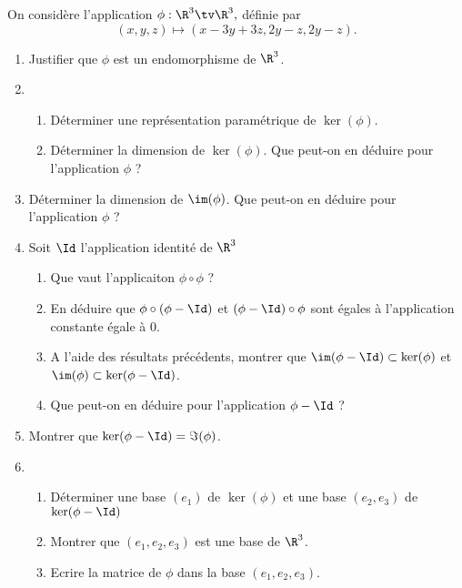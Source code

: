 



\begin{exercice}%
On considère l'application $\phi : \R^3 \tv \R^3, $ définie par 
$$(x,y,z) \mapsto (x-3y +3z, 2y-z, 2y-z).$$
\begin{enumerate}
\item Justifier que $\phi$ est un endomorphisme de $\R^3$.
\item
\begin{enumerate}
\item  Déterminer une représentation paramétrique de $\ker(\phi)$. 
\item Déterminer la dimension de $\ker (\phi)$. Que peut-on en déduire pour l'application $\phi$ ?

\end{enumerate}
\item Déterminer la dimension de $\im(\phi)$.  Que peut-on en déduire pour l'application $\phi$ ?
\item Soit $\Id$ l'application identité de $\R^3$
\begin{enumerate}
\item Que vaut l'applicaiton $\phi\circ \phi$ ?
\item En déduire que $\phi\circ (\phi-\Id)$ et $(\phi-\Id) \circ \phi$ sont égales à l'application constante égale à $0$. 
\item A l'aide des résultats précédents, montrer que $\im( \phi - \Id) \subset \ker(\phi)$ et 
$\im( \phi) \subset \ker(\phi- \Id)$.
\item Que peut-on en déduire pour l'application $\phi- \Id$ ? 
\end{enumerate}
\item Montrer que $\ker(\phi-\Id) = \Im(\phi)$.
\item \begin{enumerate}
\item Déterminer une base $(e_1)$  de $\ker(\phi)$ et une base $(e_2,e_3)$ de $\ker(\phi-\Id)$
\item Montrer que $(e_1, e_2, e_3) $ est une base de $\R^3$.
\item Ecrire la matrice de $\phi$ dans la base $(e_1, e_2, e_3) $.
\end{enumerate}
\end{enumerate}
\end{exercice}

